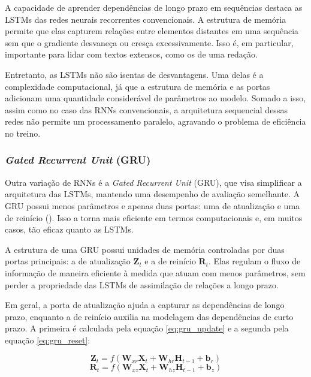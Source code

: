 A capacidade de aprender dependências de longo prazo em sequências destaca as LSTMs das redes neurais recorrentes convencionais. A estrutura de memória permite que elas capturem relações entre elementos distantes em uma sequência sem que o gradiente desvaneça ou cresça excessivamente. Isso é, em particular, importante para lidar com textos extensos, como os de uma redação.

Entretanto, as LSTMs não são isentas de desvantagens. Uma delas é a complexidade computacional, já que a estrutura de memória e as portas adicionam uma quantidade considerável de parâmetros ao modelo. Somado a isso, assim como no caso das RNNs convencionais, a arquitetura sequencial dessas redes não permite um processamento paralelo, agravando o problema de eficiência no treino.

\subsubsection{\textit{Gated Recurrent Unit} (GRU)}

Outra variação de RNNs é a \textit{Gated Recurrent Unit} (GRU), que visa simplificar a arquitetura das LSTMs, mantendo uma desempenho de avaliação semelhante. A GRU possui menos parâmetros e apenas duas portas: uma de atualização e uma de reinício (\cite{cho2014learning}). Isso a torna mais eficiente em termos computacionais e, em muitos casos, tão eficaz quanto as LSTMs.

A estrutura de uma GRU possui unidades de memória controladas por duas portas principais: a de atualização $\boldsymbol{Z}_{t}$ e a de reinício $\boldsymbol{R}_{t}$. Elas regulam o fluxo de informação de maneira eficiente à medida que atuam com menos parâmetros, sem perder a propriedade das LSTMs de assimilação de relações a longo prazo.

Em geral, a porta de atualização ajuda a capturar as dependências de longo prazo, enquanto a de reinício auxilia na modelagem das dependências de curto prazo. A primeira é calculada pela equação \ref{eq:gru_update} e a segunda pela equação \ref{eq:gru_reset}:

\begin{equation}
    \label{eq:gru_update}
    \boldsymbol{Z}_{t} = f \left( \boldsymbol{W}_{xr} \boldsymbol{X}_{t} + \boldsymbol{W}_{hr} \boldsymbol{H}_{t-1} + \boldsymbol{b}_{r} \right)
\end{equation}
\begin{equation}
    \label{eq:gru_reset}
    \boldsymbol{R}_{t} = f \left( \boldsymbol{W}_{xz} \boldsymbol{X}_{t} + \boldsymbol{W}_{hz} \boldsymbol{H}_{t-1} + \boldsymbol{b}_{z} \right)
\end{equation}

